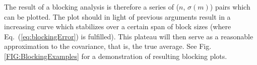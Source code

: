 The result of a blocking analysis is therefore a series of ($n$, $\sigma(m)$) pairs which can be plotted. The plot should in light of previous arguments result in a increasing curve which stabilizes over a certain span of block sizes (where Eq.~(\ref{eq:blockingError}) is fulfilled). This plateau will then serve as a reasonable approximation to the covariance, that is, the true average. See Fig. \ref{FIG:BlockingExamples} for a demonstration of resulting blocking plots.

\begin{figure}
 \begin{center}

\end{center}
\end{figure}
